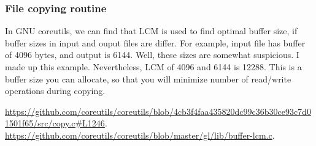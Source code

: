 \subsubsection{File copying routine}

In GNU coreutils, we can find that LCM is used to find optimal buffer size, if buffer sizes in input and ouput files are differ.
For example, input file has buffer of 4096 bytes, and output is 6144.
Well, these sizes are somewhat suspicious. I made up this example.
Nevertheless, LCM of 4096 and 6144 is 12288. This is a buffer size you can allocate, so that you will minimize number of read/write operations during copying.

\url{https://github.com/coreutils/coreutils/blob/4cb3f4faa435820dc99c36b30ce93c7d01501f65/src/copy.c#L1246}.
\url{https://github.com/coreutils/coreutils/blob/master/gl/lib/buffer-lcm.c}.

